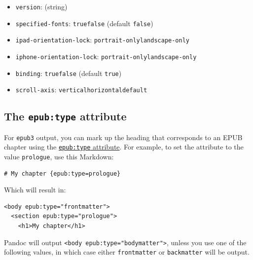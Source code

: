 \documentclass[
]{article}
\providecommand{\tightlist}{%
  \setlength{\itemsep}{0pt}\setlength{\parskip}{0pt}}
\begin{document}
\begin{description}
\begin{itemize}
\tightlist
\item
  \texttt{version}: (string)
\item
  \texttt{specified-fonts}: \texttt{true}\textbar{}\texttt{false}
  (default \texttt{false})
\item
  \texttt{ipad-orientation-lock}:
  \texttt{portrait-only}\textbar{}\texttt{landscape-only}
\item
  \texttt{iphone-orientation-lock}:
  \texttt{portrait-only}\textbar{}\texttt{landscape-only}
\item
  \texttt{binding}: \texttt{true}\textbar{}\texttt{false} (default
  \texttt{true})
\item
  \texttt{scroll-axis}:
  \texttt{vertical}\textbar{}\texttt{horizontal}\textbar{}\texttt{default}
\end{itemize}
\end{description}

\hypertarget{the-epubtype-attribute}{%
\subsection{\texorpdfstring{The \texttt{epub:type}
attribute}{The epub:type attribute}}\label{the-epubtype-attribute}}

For \texttt{epub3} output, you can mark up the heading that corresponds
to an EPUB chapter using the
\href{http://www.idpf.org/epub/31/spec/epub-contentdocs.html\#sec-epub-type-attribute}{\texttt{epub:type}
attribute}. For example, to set the attribute to the value
\texttt{prologue}, use this Markdown:

\begin{verbatim}
# My chapter {epub:type=prologue}
\end{verbatim}

Which will result in:

\begin{verbatim}
<body epub:type="frontmatter">
  <section epub:type="prologue">
    <h1>My chapter</h1>
\end{verbatim}

Pandoc will output
\texttt{\textless{}body\ epub:type="bodymatter"\textgreater{}}, unless
you use one of the following values, in which case either
\texttt{frontmatter} or \texttt{backmatter} will be output.
\end{document}
